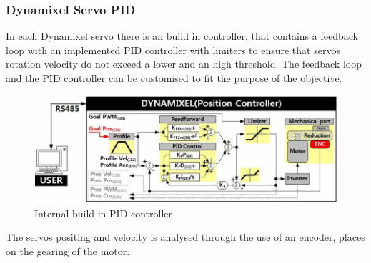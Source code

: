 \subsubsection{Dynamixel Servo PID}
In each Dynamixel servo there is an build in controller, that contains a feedback loop with an implemented PID controller with limiters to ensure that servos rotation velocity do not exceed a lower and an high threshold\cite{PIDmxx}. The feedback loop and the PID controller can be customised to fit the purpose of the objective.
\begin{figure}[H]
    \centering
    \includegraphics[width=\textwidth]{Figures/Technical_figures/PIDMX.PNG}
    \caption{Internal build in PID controller\cite{PIDmxx}}
    \label{fig:PIDMX}
\end{figure}

The servos positing and velocity is analysed through the use of an encoder, places on the gearing of the motor.  